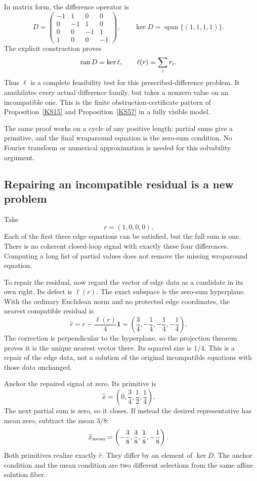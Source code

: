 In matrix form, the difference operator is
\[
 D=\begin{pmatrix}
 -1&1&0&0\\
 0&-1&1&0\\
 0&0&-1&1\\
 1&0&0&-1
 \end{pmatrix},\qquad
 \ker D=\operatorname{span}\{(1,1,1,1)\}.
\]
The explicit construction proves
\[
 \operatorname{ran} D=\ker\ell,\qquad \ell(r)=\sum_i r_i.
\]
Thus \(\ell\) is a complete feasibility test for this prescribed-difference problem. It annihilates every actual difference family, but takes a nonzero value on an incompatible one. This is the finite obstruction-certificate pattern of Proposition~\ref{KS15} and Proposition~\ref{KS57} in a fully visible model.

The same proof works on a cycle of any positive length: partial sums give a primitive, and the final wraparound equation is the zero-sum condition. No Fourier transform or numerical approximation is needed for this solvability argument.

\subsection{Repairing an incompatible residual is a new problem}
Take
\[
 r=(1,0,0,0).
\]
Each of the first three edge equations can be satisfied, but the full sum is one. There is no coherent closed-loop signal with exactly these four differences. Computing a long list of partial values does not remove the missing wraparound equation.

To repair the residual, now regard the vector of edge data as a candidate in its own right. Its defect is \(\ell(r)\). The exact subspace is the zero-sum hyperplane. With the ordinary Euclidean norm and no protected edge coordinates, the nearest compatible residual is
\[
 \widehat r=r-\frac{\ell(r)}4\mathbf1
 =\left(\frac34,-\frac14,-\frac14,-\frac14\right).
\]
The correction is perpendicular to the hyperplane, so the projection theorem proves it is the unique nearest vector there. Its squared size is \(1/4\). This is a repair of the edge data, not a solution of the original incompatible equations with those data unchanged.

Anchor the repaired signal at zero. Its primitive is
\begin{equation}\label{eq:cycle-anchor-primitive}
 \widehat x=\left(0,\frac34,\frac12,\frac14\right).
\end{equation}
The next partial sum is zero, so it closes. If instead the desired representative has mean zero, subtract the mean \(3/8\):
\[
 \widehat x_{\rm mean}
 =\left(-\frac38,\frac38,\frac18,-\frac18\right).
\]
Both primitives realize exactly \(\widehat r\). They differ by an element of \(\ker D\). The anchor condition and the mean condition are two different selections from the same affine solution fiber.

